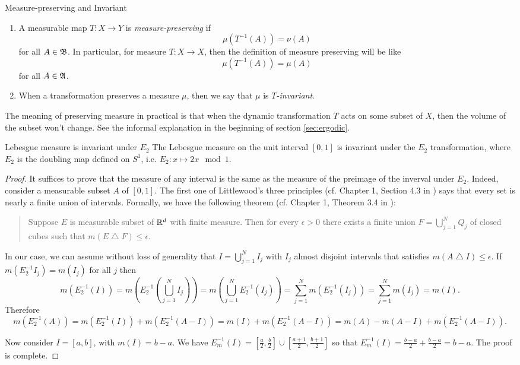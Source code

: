 \documentclass[12pt,a4paper]{article}
\begin{document}
 
 
 
 
 	\begin{definition}{Measure-preserving and Invariant}{}
 		\begin{enumerate}
 			\item A measurable map $T:X\rightarrow Y$ is \emph{measure-preserving} if $$\mu(T^{-1}(A))=\nu(A)$$ for all $A\in \mathfrak{B}$. In particular, for measure $T:X\rightarrow X$, then the definition of measure preserving will be like $$\mu(T^{-1}(A))=\mu(A)$$ for all $A\in \mathfrak{A}$.
 			\item When a transformation preserves a measure $\mu$, then we say that $\mu$ is \emph{$T$-invariant}.
 		\end{enumerate}
 	\end{definition}
 	The meaning of preserving measure in practical is that when the dynamic transformation $T$ acts on some subset of $X$, then the volume of the subset won't change. See the informal explanation in the beginning of section \ref{sec:ergodic}. 
 	\begin{example}{Lebesgue measure is invariant under $E_2$}{}
 		The Lebesgue measure on the unit interval $[0,1]$ is invariant under the $E_2$ transformation, where $E_2$ is the doubling map defined on $S^1$, i.e. $E_2:x\mapsto 2x \mod 1$.
 	\end{example}
 	\begin{proof}
 		It suffices to prove that the measure of any interval is the same as the measure of the preimage of the inverval under $E_2$. Indeed, consider a measurable subset $A$ of $[0,1]$. The first one of Littlewood's three principles (cf. Chapter 1, Section 4.3 in \cite{Stein:1385521}) says that every set is nearly a finite union of intervals. Formally, we have the following theorem (cf. Chapter 1, Theorem 3.4 in \cite{Stein:1385521}): 
 		\begin{quote}
 			Suppose $E$ is measurable subset of $\mathbb{R}^d$ with finite measure. Then for every $\epsilon>0$ there exists a finite union $F=\bigcup_{j=1}^N Q_j$ of closed cubes such that $m(E\bigtriangleup F)\leq \epsilon$. 
 		\end{quote}
 		In our case, we can assume without loss of generality that $I=\bigcup_{j=1}^N I_j$ with $I_j$ almost disjoint intervals that satisfies $m(A\bigtriangleup I)\leq \epsilon$. If $m(E^{-1}_2 I_j)=m(I_j)$ for all $j$ then 
 		$$
 		m(E_2^{-1} (I))=m(E_2^{-1}(\bigcup_{j=1}^N I_j))=m(\bigcup_{j=1}^N E_2^{-1}(I_j))=\sum_{j=1}^N m(E_2^{-1}(I_j))=\sum_{j=1}^N m(I_j)=m(I).
 		$$
 		Therefore
 		$$
 		m(E_2^{-1}(A))=m(E_2^{-1}(I))+m(E_2^{-1}(A-I))=m(I)+m(E_2^{-1}(A-I))=m(A)-m(A-I)+m(E_2^{-1}(A-I)).
 		$$
 		
 		Now consider $I=[a,b]$, with $m(I)=b-a$. We have $E_m^{-1}(I)=[\frac{a}{2},\frac{b}{2}]\cup [\frac{a+1}{2},\frac{b+1}{2}]$ so that $E_m^{-1}(I)=\frac{b-a}{2}+\frac{b-a}{2}=b-a$. The proof is complete.
 	\end{proof}
 
\end{document}

